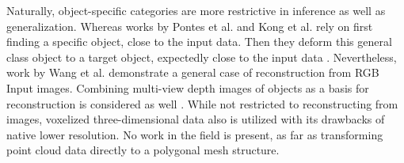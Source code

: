  Naturally, object-specific categories are more restrictive in
  inference as well as generalization. Whereas works by Pontes et al.
   and Kong et al. rely on first finding a specific object, close to
    the input data. Then they deform this general class object to a 
    target object, expectedly close to the input data \cite{cmrKanazawa18,pontes2017image2mesh,inproceedingsLocal}. Nevertheless,
     work by Wang et al. \cite{wang2018pixel2mesh} demonstrate a general case of 
     reconstruction from RGB Input images.
 Combining multi-view depth images of objects as a basis for
  reconstruction is considered as well \cite{mvcTulsiani18}.
  While not restricted to reconstructing from images, 
  voxelized three-dimensional data also is utilized
   \cite{DBLP:journals/corr/abs-1804-06032} with its drawbacks of native lower resolution.
   No work in the field is present, as far as transforming point cloud data directly to a polygonal mesh structure.
   